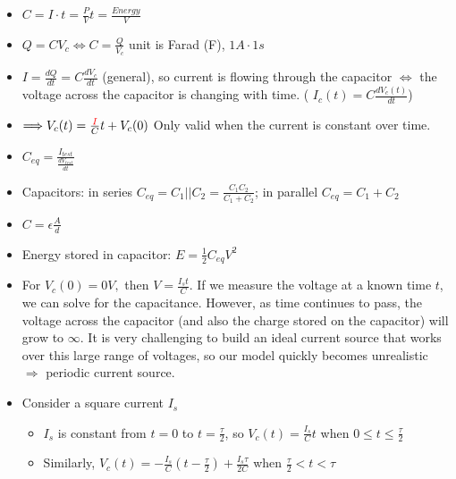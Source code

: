 \documentclass{article}
\begin{document}
\pagebreak
{}
\begin{itemize}
	\item $C = I\cdot t = \frac{P}{V}t = \frac{Energy}{V}$
	\item $Q = CV_c\iff C = \frac{Q}{V_c}$ unit is Farad (F), $1A\cdot 1s$
	\item $I = \frac{dQ}{dt} = C\frac{dV_c}{dt}$ (general), so current is flowing through the capacitor $\iff$ the voltage across the capacitor is changing with time. ({\color{red} $I_c(t) = C\frac{dV_c(t)}{dt}$})
	\item $\Longrightarrow V_c(t) = \frac{{\color{red} I}}{C}t + V_c(0)$ Only valid when the current is constant over time.
	\item $C_{eq} = \frac{I_{test}}{\frac{dV_{test}}{dt}}$
	\item Capacitors: {\color{red} in series} $C_{eq} = C_1||C_2 = \frac{C_1C_2}{C_1+C_2}$; in parallel $C_{eq} = C_1+C_2$
	\item {\color{red} $C = \epsilon\frac{A}{d}$}
	\item Energy stored in capacitor: $E = \frac{1}{2} C_{eq}V^2$
	\item For $V_c(0) = 0V,$ then $V = \frac{I_st}{C}$.	If we measure the voltage at a known time $t$, we can solve for the capacitance. However, as time continues to pass, the voltage across the capacitor (and also the charge stored on the capacitor) will grow to $\infty$. It is very challenging to build an ideal current source that works over this large range of voltages, so our model quickly becomes unrealistic $\Longrightarrow$ periodic current source.
	\item Consider a square current $I_s$
	\begin{itemize}
		\item $I_s$ is constant from $t=0$ to $t = \frac{\tau}{2}$, so $V_c(t) = \frac{I_s}{C}t$ when $0\leq t\leq\frac{\tau}{2}$
		\item Similarly, $V_c(t) = -\frac{I_s}{C}(t-\frac{\tau}{2}) + \frac{I_s\tau}{2C}$ when $\frac{\tau}{2}<t<\tau$
	\end{itemize}


\end{itemize}
\end{document}

